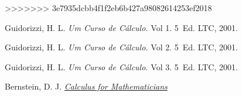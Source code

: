 \documentclass{book}
\begin{document}
>>>>>>> 3e7935dcbb4f1f2eb6b427a98082614253ef2018


\begin{thebibliography}{99}

 Guidorizzi, H. L. {\sl Um Curso de Cálculo.} Vol 1. 5\textordfeminine\ Ed. LTC, 2001.

 Guidorizzi, H. L. {\sl Um Curso de Cálculo.} Vol 2. 5\textordfeminine\ Ed. LTC, 2001.

 Guidorizzi, H. L. {\sl Um Curso de Cálculo.} Vol 3. 5\textordfeminine\ Ed. LTC, 2001.

 Bernstein, D. J. \href{http://cr.yp.to/papers/calculus.pdf}{{\sl Calculus for Mathematicians}}

\end{thebibliography}

\printindex
\end{document}

